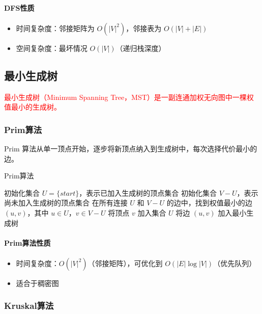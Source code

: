 \documentclass{../../note}
\begin{document}
\paragraph{DFS性质}
\begin{itemize}
\item 时间复杂度：邻接矩阵为 $O(|V|^2)$，邻接表为 $O(|V|+|E|)$
\item 空间复杂度：最坏情况 $O(|V|)$（递归栈深度）
\end{itemize}

\subsection{最小生成树}

\textcolor{red}{最小生成树（Minimum Spanning Tree，MST）是一副连通加权无向图中一棵权值最小的生成树。}

\subsubsection{Prim算法}

Prim 算法从单一顶点开始，逐步将新顶点纳入到生成树中，每次选择代价最小的边。

\begin{algorithm}
\caption{Prim算法}
\begin{algorithmic}[1]
  \State 初始化集合 $U = \{start\}$，表示已加入生成树的顶点集合
  \State 初始化集合 $V-U$，表示尚未加入生成树的顶点集合
  \State 在所有连接 $U$ 和 $V-U$ 的边中，找到权值最小的边 $(u,v)$，其中 $u \in U$，$v \in V-U$
  \State 将顶点 $v$ 加入集合 $U$
  \State 将边 $(u,v)$ 加入最小生成树
  \EndWhile
  \EndProcedure
\end{algorithmic}
\end{algorithm}

\paragraph{Prim算法性质}
\begin{itemize}
\item 时间复杂度：$O(|V|^2)$（邻接矩阵），可优化到 $O(|E|\log|V|)$（优先队列）
\item 适合于稠密图
\end{itemize}

\subsubsection{Kruskal算法}
\end{document}
